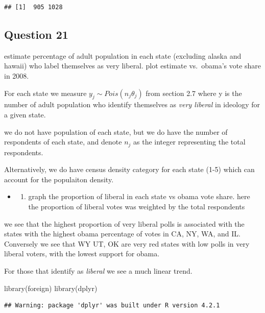 \documentclass[
]{book}
\newenvironment{Shaded}{\begin{snugshade}}{\end{snugshade}}
\newcommand{\FunctionTok}[1]{\textcolor[rgb]{0.00,0.00,0.00}{#1}}
\newcommand{\NormalTok}[1]{#1}
\providecommand{\tightlist}{%
  \setlength{\itemsep}{0pt}\setlength{\parskip}{0pt}}
\theoremstyle{definition}
\theoremstyle{definition}
\theoremstyle{definition}
\theoremstyle{definition}
\theoremstyle{remark}
\begin{document}
\begin{verbatim}
## [1]  905 1028
\end{verbatim}

\hypertarget{question-21}{%
\subsection{Question 21}\label{question-21}}

estimate percentage of adult population in each state (excluding alaska and hawaii) who label themselves as very liberal. plot estimate vs.~obama's vote share in 2008.

For each state we measure \(y_j\sim Pois(n_j\theta_j)\) from section 2.7 where y is the number of adult population who identify themselves as \emph{very liberal} in ideology for a given state.

we do not have population of each state, but we do have the number of respondents of each state, and denote \(n_j\) as the integer representing the total respondents.

Alternatively, we do have census density category for each state (1-5) which can account for the populaiton density.

\begin{itemize}
\item
  \begin{enumerate}
  \def\labelenumi{(\alph{enumi})}
  \tightlist
  \item
    graph the proportion of liberal in each state vs obama vote share. here the proportion of liberal votes was weighted by the total respondents
  \end{enumerate}
\end{itemize}

we see that the highest proportion of very liberal polls is associated with the states with the highest obama percentage of votes in CA, NY, WA, and IL. Conversely we see that WY UT, OK are very red states with low polls in very liberal voters, with the lowest support for obama.

For those that identify as \emph{liberal} we see a much linear trend.

\begin{Shaded}
\begin{Highlighting}[]
 \FunctionTok{library}\NormalTok{(foreign)}
 \FunctionTok{library}\NormalTok{(dplyr)}
\end{Highlighting}
\end{Shaded}

\begin{verbatim}
## Warning: package 'dplyr' was built under R version 4.2.1
\end{verbatim}
\end{document}
